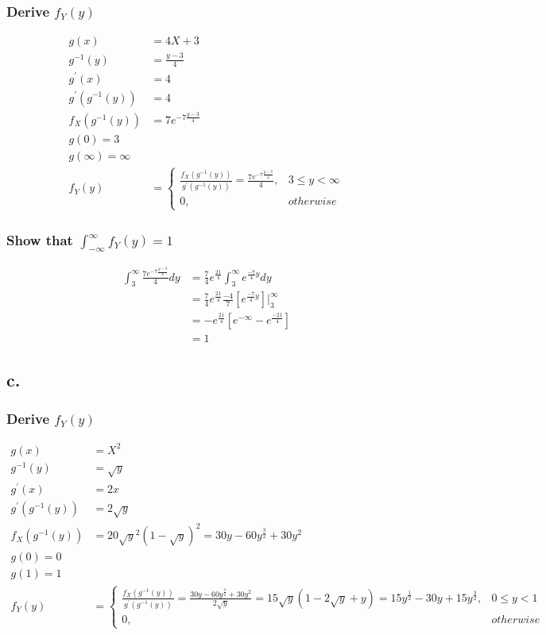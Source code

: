 \documentclass[12pt]{article}
\begin{document}
\subsubsection*{Derive $f_Y(y)$}
\begin{align*}
  g(x) &= 4X + 3 \\
  g^{-1}(y) &= \frac{y-3}{4} \\
  g^{'}(x) &= 4 \\
  g^{'}(g^{-1}(y)) &= 4 \\
  f_X(g^{-1}(y)) &= 7e^{-7\frac{y-3}{4}} \\
  g(0) = 3 \\
  g(\infty) = \infty \\
  f_Y(y) &= 
  \begin{cases}
    \frac{f_X(g^{-1}(y))}{g^{'}(g^{-1}(y))} 
    = \frac{7e^{-7\frac{y-3}{4}}}{4}, & 3 \leq y < \infty \\
    0, & otherwise
  \end{cases}
\end{align*}

\subsubsection*{Show that $\int_{-\infty}^\infty f_Y(y) = 1$}
\begin{align*}
  \int_3^\infty \frac{7e^{-7\frac{y-3}{4}}}{4}dy
  &= \frac{7}{4}e^{\frac{21}{4}}\int_3^\infty e^{\frac{-7}{4}y}dy \\
  &= \frac{7}{4}e^{\frac{21}{4}}\frac{-4}{7}\left[e^{\frac{-7}{4}y} \right]\big|_3^\infty \\
  &= -e^{\frac{21}{4}}\left[ e^{-\infty} - e^{\frac{-21}{4}}  \right] \\
  &= 1
\end{align*}

\subsection*{c.}

\subsubsection*{Derive $f_Y(y)$}
\begin{align*}
  g(x) &= X^2 \\
  g^{-1}(y) &= \sqrt{y} \\
  g^{'}(x) &= 2x \\
  g^{'}(g^{-1}(y)) &= 2\sqrt{y} \\
  f_X(g^{-1}(y)) &= 20\sqrt{y}^2(1-\sqrt{y})^2 = 30y - 60y^{\frac{3}{2}} + 30y^2 \\
  g(0) = 0 \\
  g(1) = 1 \\
  f_Y(y) &= 
  \begin{cases}
    \frac{f_X(g^{-1}(y))}{g^{'}(g^{-1}(y))} 
    = \frac{30y - 60y^{\frac{3}{2}} + 30y^2}{2\sqrt{y}}
    = 15\sqrt{y}(1-2\sqrt{y} + y) 
    = 15y^{\frac{1}{2}}-30y+15y^{\frac{3}{2}}, & 0 \leq y < 1 \\
    0, & otherwise
  \end{cases}
\end{align*}
\end{document}
